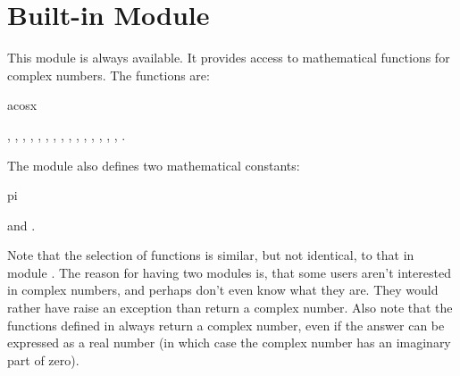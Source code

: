 \section{Built-in Module }
\label{module-cmath}

\renewcommand{\indexsubitem}{(in module cmath)}
This module is always available.
It provides access to mathematical functions for complex numbers.
The functions are:
\iftexi
\begin{funcdesc}{acos}{x}
\end{funcdesc}
\else
{},
,
,
,
,
,
,
,
,
,
,
,
,
,
,
.
\fi

The module also defines two mathematical constants:
\iftexi
\begin{datadesc}{pi}
\end{datadesc}
\else
{} and .
\fi

Note that the selection of functions is similar, but not identical, to
that in module .  The reason for having two modules is,
that some users aren't interested in complex numbers, and perhaps
don't even know what they are.  They would rather have 
raise an exception than return a complex number.  Also note that the
functions defined in  always return a complex number, even
if the answer can be expressed as a real number (in which case the
complex number has an imaginary part of zero).
